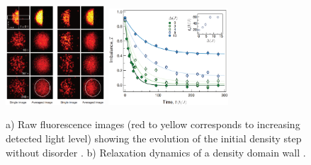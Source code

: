 \begin{figure}[h]
    \centering
    \includegraphics[align=c, width=0.33\textwidth]{imgs/MBL_2D_exp_1.png}
    \hspace{10 mm} 
    \includegraphics[align=c, width=0.4\textwidth]{imgs/MBL_2D_exp_2.png}
    \caption{
        a) Raw fluorescence images (red to yellow corresponds to increasing detected light level) showing the evolution of the initial density step without disorder \cite{Choi_2016} . 
        b) Relaxation dynamics of a density domain wall \cite{Choi_2016} .
    }
    \label{fig:loc2D1}
\end{figure}


